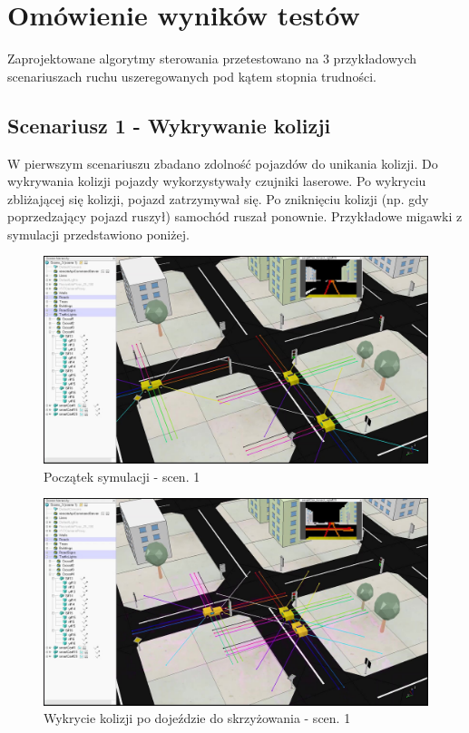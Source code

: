 \section{Omówienie wyników testów}

Zaprojektowane algorytmy sterowania przetestowano na 3 przykładowych scenariuszach ruchu uszeregowanych pod kątem stopnia trudności.

\subsection{Scenariusz 1 - Wykrywanie kolizji}

W pierwszym scenariuszu zbadano zdolność pojazdów do unikania kolizji. Do wykrywania kolizji pojazdy wykorzystywały czujniki laserowe. Po wykryciu zbliżającej się kolizji, pojazd zatrzymywał się. Po zniknięciu kolizji (np. gdy poprzedzający pojazd ruszył) samochód ruszał ponownie. Przykładowe migawki z symulacji przedstawiono poniżej.

\begin{figure}[!h]
	\centering
	\centering
	\includegraphics[width=.8\linewidth]{p11.jpg}
	\caption{Początek symulacji - scen. 1}
	\label{fig:p11}
\end{figure}

\begin{figure}[!h]
	\centering
	\centering
	\includegraphics[width=.8\linewidth]{p12.jpg}
	\caption{Wykrycie kolizji po dojeździe do skrzyżowania - scen. 1}
	\label{fig:p12}
\end{figure}

